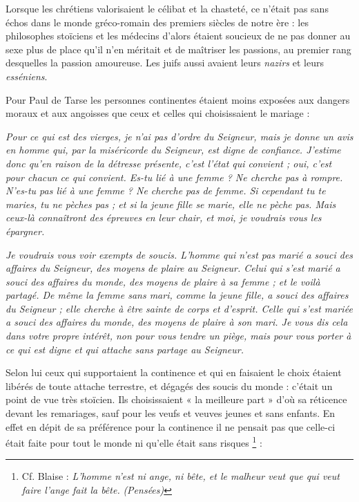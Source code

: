  Lorsque les chrétiens valorisaient le célibat et la chasteté, ce n'était pas sans échos dans le monde gréco-romain des premiers siècles de notre ère : les philosophes stoïciens et les médecins d'alors étaient soucieux de ne pas donner au sexe plus de place qu'il n'en méritait et de maîtriser les passions, au premier rang desquelles la passion amoureuse. Les juifs aussi avaient leurs \emph{nazirs} et leurs \emph{esséniens}. 

 Pour Paul de Tarse les personnes continentes étaient moins exposées aux dangers moraux et aux angoisses que ceux et celles qui choisissaient le mariage :

\begin{displayquote}[I~Cor~7,~25-28]
\emph{Pour ce qui est des vierges, je n'ai pas d'ordre du Seigneur, mais je donne un avis en homme qui, par la miséricorde du Seigneur, est digne de confiance. J'estime donc qu'en raison de la détresse présente, c'est l'état qui convient ; oui, c'est pour chacun ce qui convient. Es-tu lié à une femme ? Ne cherche pas à rompre. N'es-tu pas lié à une femme ? Ne cherche pas de femme. Si cependant tu te maries, tu ne pèches pas ; et si la jeune fille se marie, elle ne pèche pas. Mais ceux-là connaîtront des épreuves en leur chair, et moi, je voudrais vous les épargner.}
\end{displayquote}

\begin{displayquote}[I~Cor~7,~32-35]
\emph{Je voudrais vous voir exempts de soucis. L'homme qui n'est pas marié a souci des affaires du Seigneur, des moyens de plaire au Seigneur. Celui qui s'est marié a souci des affaires du monde, des moyens de plaire à sa femme ; et le voilà partagé. De même la femme sans mari, comme la jeune fille, a souci des affaires du Seigneur ; elle cherche à être sainte de corps et d'esprit. Celle qui s'est mariée a souci des affaires du monde, des moyens de plaire à son mari. Je vous dis cela dans votre propre intérêt, non pour vous tendre un piège, mais pour vous porter à ce qui est digne et qui attache sans partage au Seigneur.}
\end{displayquote}

 Selon lui ceux qui supportaient la continence et qui en faisaient le choix étaient libérés de toute attache terrestre, et dégagés des soucis du monde : c'était un point de vue très stoïcien. Ils choisissaient « la meilleure part » d'où sa réticence devant les remariages, sauf pour les veufs et veuves jeunes et sans enfants. En effet en dépit de sa préférence pour la continence il ne pensait pas que celle-ci était faite pour tout le monde ni qu'elle était sans risques%
\footnote{Cf. Blaise  : \emph{L'homme n'est ni ange, ni bête, et le malheur veut que qui veut faire l'ange fait la bête.} \emph{(Pensées)}}
:


